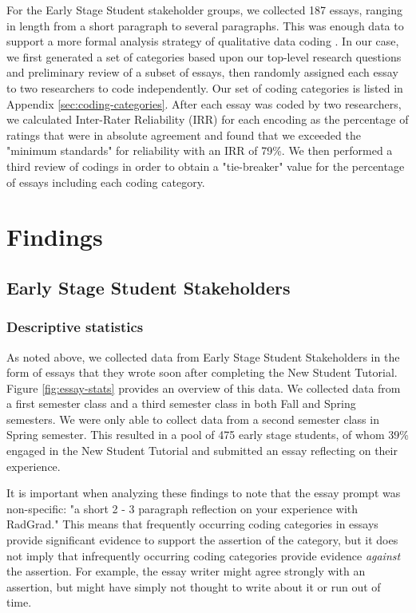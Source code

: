 \documentclass[acmsmall,nonacm]{acmart}
\begin{document}
For the Early Stage Student stakeholder groups, we collected 187 essays, ranging in length from a short paragraph to several paragraphs. This was enough data to support a more formal analysis strategy of qualitative data coding \cite{braun_successful_2013}. In our case, we first generated a set of categories based upon our top-level research questions and preliminary review of a subset of essays, then randomly assigned each essay to two researchers to code independently. Our set of coding categories is listed in Appendix \ref{sec:coding-categories}. After each essay was coded by two researchers, we calculated Inter-Rater Reliability (IRR) for each encoding as the percentage of ratings that were in absolute agreement and found that we exceeded the "minimum standards" for reliability \cite{graham_measuring_2012} with an IRR of 79\%. We then performed a third review of codings in order to obtain a "tie-breaker" value for the percentage of essays including each coding category.

\section{Findings}

\subsection{Early Stage Student Stakeholders}

\subsubsection{Descriptive statistics}

As noted above, we collected data from Early Stage Student Stakeholders in the form of essays that they wrote soon after completing the New Student Tutorial.  Figure \ref{fig:essay-stats} provides an overview of this data. We collected data from a first semester class and a third semester class in both Fall and Spring semesters. We were only able to collect data from a second semester class in Spring semester. This resulted in a pool of 475 early stage students, of whom 39\% engaged in the New Student Tutorial and submitted an essay reflecting on their experience.

It is important when analyzing these findings to note that the essay prompt was non-specific: "a short 2 - 3 paragraph reflection on your experience with RadGrad."  This means that frequently occurring coding categories in essays provide significant evidence to support the assertion of the category, but it does not imply that infrequently occurring coding categories provide evidence {\em against} the assertion. For example, the essay writer might agree strongly with an assertion, but might have simply not thought to write about it or run out of time.
\end{document}
